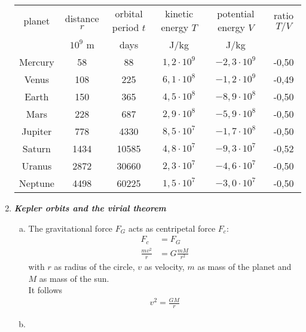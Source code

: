 \documentclass[a4paper,12pt]{article}
\newcommand{\question}[1]{\textbf{\textit{#1}}}
\begin{document}
\begin{enumerate}
		\begin{table}[h]
			\begin{center}
            \bgroup
            \renewcommand{\arraystretch}{1.2}
				\begin{tabular}{|c|cc|cc|c|}
					\hline
					planet & distance $r$ & orbital period $t$ & kinetic energy $T$ & potential energy $V$ & ratio $T/V$\\
					& $10^{9}$ m & days & J/kg & J/kg & \\
					\hline
					Mercury & 58 & 88 & $1,2\cdot 10^{9}$ & $-2,3\cdot 10^{9}$ & -0,50\\
					Venus & 108 & 225 & $6,1\cdot 10^{8}$ & $-1,2\cdot 10^{9}$ & -0,49\\
					Earth & 150 & 365 & $4,5\cdot 10^{8}$ & $-8,9\cdot 10^{8}$ & -0,50\\
					Mars & 228 & 687 & $2,9\cdot 10^{8}$ & $-5,9\cdot 10^{8}$ & -0,50 \\
					Jupiter & 778 & 4330 & $8,5\cdot 10^{7}$ & $-1,7\cdot 10^{8}$ & -0,50 \\
					Saturn & 1434 & 10585 & $4,8\cdot 10^{7}$ & $-9,3\cdot 10^{7}$ & -0,52 \\
					Uranus & 2872 & 30660 & $2,3\cdot 10^{7}$ & $-4,6\cdot 10^{7}$ & -0,50 \\
					Neptune & 4498 & 60225 & $1,5\cdot 10^{7}$ & $-3,0\cdot 10^{7}$ & -0,50 \\
					\hline
				\end{tabular}
                \egroup
			\end{center}
		\end{table}
		
		\setcounter{equation}{0}
		\item \question{Kepler orbits and the virial theorem}
		\begin{enumerate}[(a)]
			\item
			
			The gravitational force $F_G$ acts as centripetal force $F_c$:
			\begin{align*}
			F_c &=F_G\\
			\frac{mv^2}{r}&=G\frac{mM}{r^2}
			\end{align*}
			with $r$ as radius of the circle, $v$ as velocity, $m$ as mass of the planet and $M$ as mass of the sun.\\
			It follows
			\begin{align*}
			v^2=\frac{GM}{r}
			\end{align*}
			
			\item
			

\end{enumerate}
\end{enumerate}
\end{document}
